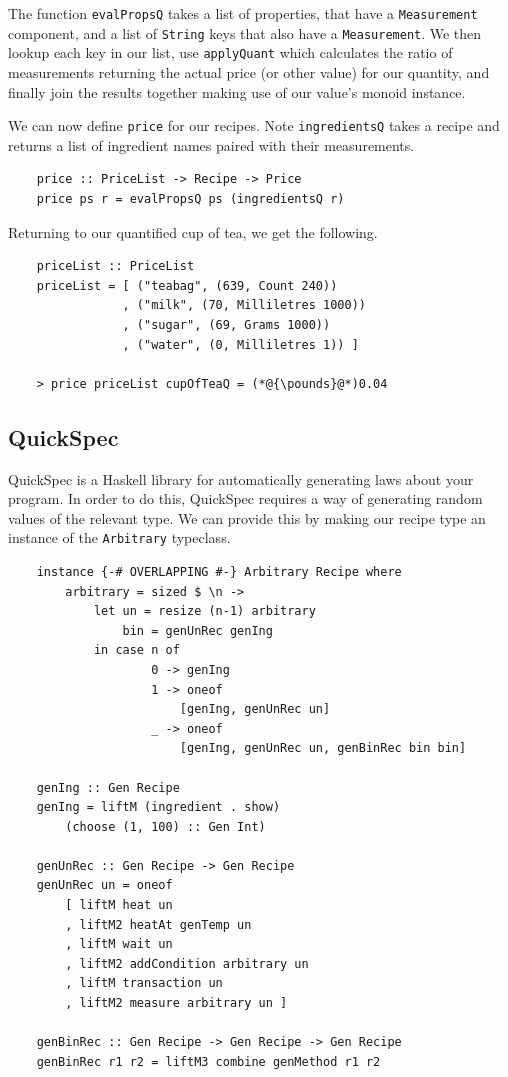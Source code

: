 \documentclass[11pt]{article}
\begin{document}
The function \texttt{evalPropsQ} takes a list of properties, that have a \texttt{Measurement}
component, and a list of \texttt{String} keys that also have a \texttt{Measurement}.
We then lookup each key in our list, use \texttt{applyQuant} which calculates the ratio
of measurements returning the actual price (or other value) for our quantity, and finally
join the results together making use of our value's monoid instance.

\medbreak

We can now define \texttt{price} for our recipes. Note \texttt{ingredientsQ} takes a recipe
and returns a list of ingredient names paired with their measurements.

\begin{lstlisting}
    price :: PriceList -> Recipe -> Price
    price ps r = evalPropsQ ps (ingredientsQ r)
\end{lstlisting}

Returning to our quantified cup of tea, we get the following.

\begin{lstlisting}
    priceList :: PriceList
    priceList = [ ("teabag", (639, Count 240))
                , ("milk", (70, Milliletres 1000))
                , ("sugar", (69, Grams 1000))
                , ("water", (0, Milliletres 1)) ]

    > price priceList cupOfTeaQ = (*@{\pounds}@*)0.04
\end{lstlisting}

\subsection{QuickSpec}

QuickSpec \cite{quickspec, quickspec2} is a Haskell library for automatically generating
laws about your program. In order to do this, QuickSpec requires a way of generating
random values of the relevant type. We can provide this by making our recipe type
an instance of the \texttt{Arbitrary} typeclass.

\begin{lstlisting}
    instance {-# OVERLAPPING #-} Arbitrary Recipe where
        arbitrary = sized $ \n ->
            let un = resize (n-1) arbitrary
                bin = genUnRec genIng
            in case n of
                    0 -> genIng
                    1 -> oneof
                        [genIng, genUnRec un]
                    _ -> oneof
                        [genIng, genUnRec un, genBinRec bin bin]

    genIng :: Gen Recipe
    genIng = liftM (ingredient . show)
        (choose (1, 100) :: Gen Int)

    genUnRec :: Gen Recipe -> Gen Recipe
    genUnRec un = oneof
        [ liftM heat un
        , liftM2 heatAt genTemp un
        , liftM wait un
        , liftM2 addCondition arbitrary un
        , liftM transaction un
        , liftM2 measure arbitrary un ]

    genBinRec :: Gen Recipe -> Gen Recipe -> Gen Recipe
    genBinRec r1 r2 = liftM3 combine genMethod r1 r2
\end{lstlisting}
\end{document}
